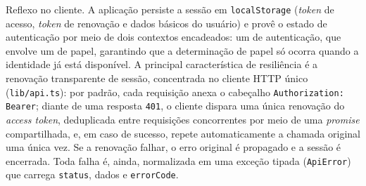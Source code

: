Reflexo no cliente. A aplicação persiste a sessão em \texttt{localStorage} (\textit{token} de acesso, \textit{token} de renovação e dados básicos do usuário) e provê o estado de autenticação por meio de dois contextos encadeados: um de autenticação, que envolve um de papel, garantindo que a determinação de papel só ocorra quando a identidade já está disponível. A principal característica de resiliência é a renovação transparente de sessão, concentrada no cliente HTTP único (\texttt{lib/api.ts}): por padrão, cada requisição anexa o cabeçalho \texttt{Authorization: Bearer}; diante de uma resposta \texttt{401}, o cliente dispara uma única renovação do \textit{access token}, deduplicada entre requisições concorrentes por meio de uma \textit{promise} compartilhada, e, em caso de sucesso, repete automaticamente a chamada original uma única vez. Se a renovação falhar, o erro original é propagado e a sessão é encerrada. Toda falha é, ainda, normalizada em uma exceção tipada (\texttt{ApiError}) que carrega \texttt{status}, dados e \texttt{errorCode}.

